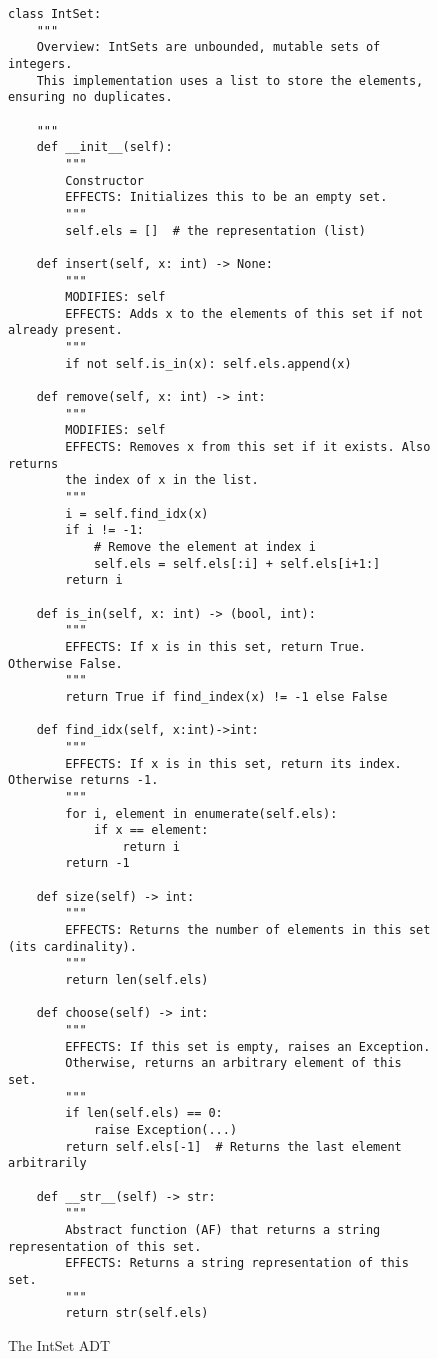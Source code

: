 \documentclass[oneside,11pt,dvipsnames]{book}
\begin{document}
\begin{figure}
    \begin{lstlisting}
class IntSet:
    """
    Overview: IntSets are unbounded, mutable sets of integers.
    This implementation uses a list to store the elements, ensuring no duplicates.

    """
    def __init__(self):
        """
        Constructor
        EFFECTS: Initializes this to be an empty set.
        """
        self.els = []  # the representation (list)

    def insert(self, x: int) -> None:
        """
        MODIFIES: self
        EFFECTS: Adds x to the elements of this set if not already present.
        """
        if not self.is_in(x): self.els.append(x)
            
    def remove(self, x: int) -> int:
        """
        MODIFIES: self
        EFFECTS: Removes x from this set if it exists. Also returns       
        the index of x in the list.
        """
        i = self.find_idx(x)
        if i != -1:
            # Remove the element at index i
            self.els = self.els[:i] + self.els[i+1:]  
        return i

    def is_in(self, x: int) -> (bool, int):
        """
        EFFECTS: If x is in this set, return True. Otherwise False.
        """
        return True if find_index(x) != -1 else False

    def find_idx(self, x:int)->int:
        """
        EFFECTS: If x is in this set, return its index. Otherwise returns -1.
        """
        for i, element in enumerate(self.els):
            if x == element:
                return i
        return -1

    def size(self) -> int:
        """
        EFFECTS: Returns the number of elements in this set (its cardinality).
        """
        return len(self.els)

    def choose(self) -> int:
        """
        EFFECTS: If this set is empty, raises an Exception. 
        Otherwise, returns an arbitrary element of this set.
        """
        if len(self.els) == 0:
            raise Exception(...)
        return self.els[-1]  # Returns the last element arbitrarily

    def __str__(self) -> str:
        """
        Abstract function (AF) that returns a string representation of this set.
        EFFECTS: Returns a string representation of this set.
        """
        return str(self.els)
\end{lstlisting}
\caption{The IntSet ADT}\label{ex:intset}
\end{figure}
\end{document}
